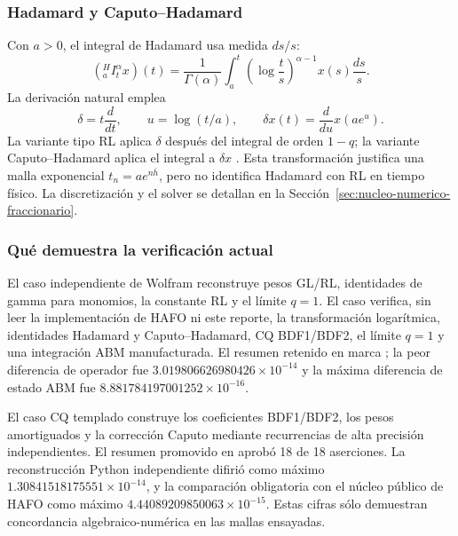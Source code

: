 \subsubsection{Hadamard y Caputo--Hadamard}

Con \(a>0\), el integral de Hadamard usa medida \(ds/s\):
\[
 ({}_a^HI_t^\alpha x)(t)=\frac{1}{\Gamma(\alpha)}
 \int_a^t\left(\log\frac{t}{s}\right)^{\alpha-1}x(s)\frac{ds}{s}.
\]
La derivación natural emplea
\[
 \delta=t\frac{d}{dt},\qquad
 u=\log(t/a),\qquad
 \delta x(t)=\frac{d}{du}x(ae^u).
\]
La variante tipo RL aplica \(\delta\) después del integral de orden \(1-q\);
la variante Caputo--Hadamard aplica el integral a \(\delta x\)
\cite{JaradEtAl2012}. Esta transformación justifica una malla exponencial
\(t_n=ae^{n\bar h}\), pero no identifica Hadamard con RL en tiempo físico.
La discretización y el solver se detallan en la
Sección~\ref{sec:nucleo-numerico-fraccionario}.

\subsubsection{Qué demuestra la verificación actual}

El caso independiente de Wolfram
reconstruye pesos GL/RL, identidades de gamma para monomios, la constante RL y
el límite \(q=1\). El caso
 verifica,
sin leer la implementación de HAFO ni este reporte, la transformación
logarítmica, identidades Hadamard y Caputo--Hadamard, CQ BDF1/BDF2, el límite
\(q=1\) y una integración ABM manufacturada. El resumen retenido en
marca ; la peor diferencia de operador fue
\(3.019806626980426\times10^{-14}\) y la máxima diferencia de estado ABM fue
\(8.881784197001252\times10^{-16}\).

El caso CQ templado
construye los coeficientes BDF1/BDF2, los pesos amortiguados y la corrección
Caputo mediante recurrencias de alta precisión independientes. El resumen
promovido en
aprobó 18 de 18 aserciones. La reconstrucción Python independiente difirió
como máximo \(1.30841518175551\times10^{-14}\), y la comparación obligatoria
con el núcleo público de HAFO como máximo
\(4.44089209850063\times10^{-15}\). Estas cifras sólo demuestran concordancia
algebraico-numérica en las mallas ensayadas.


